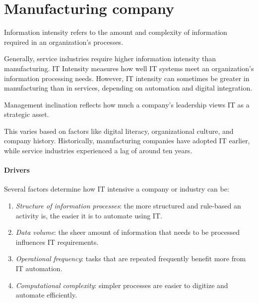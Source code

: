 \section{Manufacturing company}

\begin{definition}
    Information intensity refers to the amount and complexity of information required in an organization's processes. 
\end{definition}
\noindent Generally, service industries require higher information intensity than manufacturing.
IT Intensity measures how well IT systems meet an organization's information processing needs. 
However, IT intensity can sometimes be greater in manufacturing than in services, depending on automation and digital integration.
\begin{definition}
    Management inclination reflects how much a company's leadership views IT as a strategic asset. 
\end{definition}
\noindent This varies based on factors like digital literacy, organizational culture, and company history.
Historically, manufacturing companies have adopted IT earlier, while service industries experienced a lag of around ten years.

\paragraph*{Drivers}
Several factors determine how IT intensive a company or industry can be:
\begin{enumerate}
    \item \textit{Structure of information processes}: the more structured and rule-based an activity is, the easier it is to automate using IT.
    \item \textit{Data volume}: the sheer amount of information that needs to be processed influences IT requirements.
    \item \textit{Operational frequency}: tasks that are repeated frequently benefit more from IT automation.
    \item \textit{Computational complexity}: simpler processes are easier to digitize and automate efficiently.
\end{enumerate}

